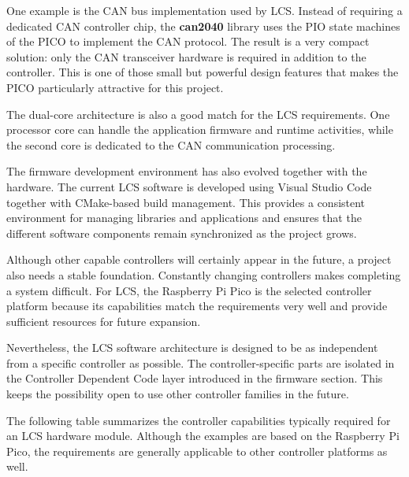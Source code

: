 One example is the CAN bus implementation used by LCS. Instead of requiring a dedicated CAN 
controller chip, the \textbf{can2040} library uses the PIO state machines of the PICO to implement 
the CAN protocol. The result is a very compact solution: only the CAN transceiver hardware is 
required in addition to the controller.
This is one of those small but powerful design features that makes the PICO particularly attractive 
for this project.

The dual-core architecture is also a good match for the LCS requirements. One processor core can 
handle the application firmware and runtime activities, while the second core is dedicated to the 
CAN communication processing.

The firmware development environment has also evolved together with the hardware. The current LCS 
software is developed using Visual Studio Code together with CMake-based build management. This 
provides a consistent environment for managing libraries and applications and ensures that the 
different software components remain synchronized as the project grows.

Although other capable controllers will certainly appear in the future, a project also needs a stable 
foundation. Constantly changing controllers makes completing a system difficult. For LCS, the 
Raspberry Pi Pico is the selected controller platform because its capabilities match the requirements 
very well and provide sufficient resources for future expansion.

Nevertheless, the LCS software architecture is designed to be as independent from a specific 
controller as possible. The controller-specific parts are isolated in the Controller Dependent Code 
layer introduced in the firmware section. This keeps the possibility open to use other controller 
families in the future.



The following table summarizes the controller capabilities typically required for an LCS hardware 
module. Although the examples are based on the Raspberry Pi Pico, the requirements are generally 
applicable to other controller platforms as well.


